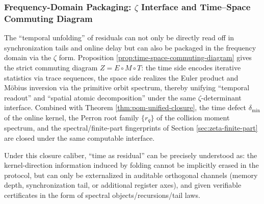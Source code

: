 \subsubsection{Frequency-Domain Packaging: \texorpdfstring{$\zeta$}{zeta} Interface and Time--Space Commuting Diagram}\label{subsubsec:frt-zeta-packaging}
The ``temporal unfolding'' of residuals can not only be directly read off in synchronization tails and online delay but can also be packaged in the frequency domain via the \(\zeta\) form. Proposition \ref{prop:time-space-commuting-diagram} gives the strict commuting diagram \(Z=E\circ M\circ T\): the time side encodes iterative statistics via trace sequences, the space side realizes the Euler product and M\"{o}bius inversion via the primitive orbit spectrum, thereby unifying ``temporal readout'' and ``spatial atomic decomposition'' under the same \(\zeta\)-determinant interface. Combined with Theorem \ref{thm:pom-unified-closure}, the time defect \(\delta_{\min}\) of the online kernel, the Perron root family \(\{r_q\}\) of the collision moment spectrum, and the spectral/finite-part fingerprints of Section \ref{sec:zeta-finite-part} are closed under the same computable interface.\par
Under this closure caliber, ``time as residual'' can be precisely understood as: the kernel-direction information induced by folding cannot be implicitly erased in the protocol, but can only be externalized in auditable orthogonal channels (memory depth, synchronization tail, or additional register axes), and given verifiable certificates in the form of spectral objects/recursions/tail laws.

